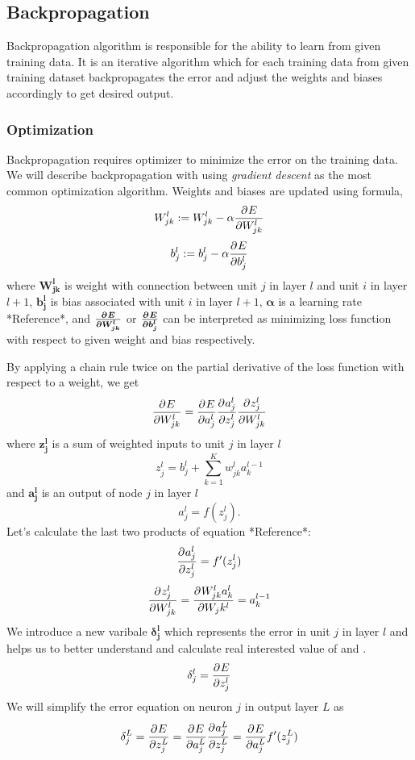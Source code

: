 \subsection{Backpropagation}

Backpropagation algorithm is responsible for the ability to learn from given training data.
It is an iterative algorithm which for each training data %
from given training dataset backpropagates the error and adjust the weights and biases accordingly to get desired output.

\subsubsection{Optimization}

Backpropagation requires optimizer to minimize the error on the training data.
We will describe backpropagation with using \textit{gradient descent} as the most common optimization algorithm.
\newline
Weights and biases are updated using formula,
\[  W_{jk}^l := W_{jk}^l - \alpha\frac{\partial^{} E}{\partial W_{jk}^l} \]
\[ b_j^l := b_j^l - \alpha\frac{\partial^{} E}{\partial b_j^l} \]
where $\boldsymbol{W_{jk}^l}$ is weight with connection between unit $j$ in layer $l$ and unit $i$ in layer $l+1$, $\boldsymbol{b_j^l}$ is bias associated with unit
$i$ in layer $l+1$, $\boldsymbol{\alpha}$ is a learning rate *Reference*, and $\boldsymbol{\frac{\partial^{} E}{\partial W_{jk}^l}}$ or $\boldsymbol{\frac{\partial^{} E}{\partial b_j^l}}$ can be interpreted as minimizing loss function with respect to given weight and bias respectively.
\par
By applying a chain rule twice on the partial derivative of the loss function with respect to a weight, we get
\[  \frac{\partial^{} E}{\partial W_{jk}^l} = \frac{\partial^{} E}{\partial a_j^l}\frac{\partial^{} a_j^l}{\partial z_j^l}\frac{\partial^{} z_j^l}{\partial W_{jk}^l} \]
where $\boldsymbol{z_j^l}$ is a sum of weighted inputs to unit $j$ in layer $l$
\[  z_j^l =  b_j^l + \sum_{k=1}^K {w_{jk}^l}{a_k^{l-1}}  \]
and $\boldsymbol{a_j^l}$ is an output of node $j$ in layer $l$
\[  a_j^l =  f(z_j^l).  \]
Let's calculate the last two products of equation *Reference*:
\[  \frac{\partial^{} a_j^l}{\partial z_j^l} = f'(z_j^l)  \]
\[  \frac{\partial^{} z_j^l}{\partial W_{jk}^l} = \frac{\partial^{} W_{jk}^{l}a_k^{l}}{\partial W_jk^l} = a_k^{l-1}  \]
We introduce a new varibale $\boldsymbol{\delta_j^l}$ which represents the error in unit $j$ in layer $l$ and helps us to better understand and calculate real interested value of  and .
\[  \delta_j^l = \frac{\partial^{} E}{\partial z_j^l} \]
We will simplify the error equation on neuron $j$ in output layer $L$ as
\[  \delta_j^L = \frac{\partial^{} E}{\partial z_j^L} = \frac{\partial^{} E}{\partial a_j^L}\frac{\partial^{} a_j^L}{\partial z_j^L} = \frac{\partial^{} E}{\partial a_j^L}f'(z_j^L)\]
